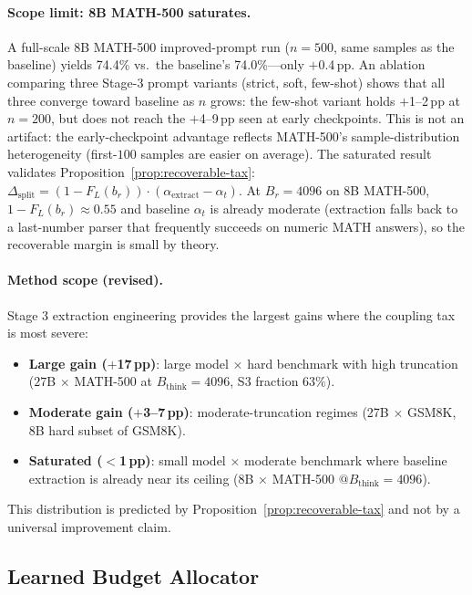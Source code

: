 \paragraph{Scope limit: 8B MATH-500 saturates.}
A full-scale 8B MATH-500 improved-prompt run ($n{=}500$, same samples as the baseline) yields 74.4\% vs.\ the baseline's 74.0\%---only $+$0.4\,pp.
An ablation comparing three Stage-3 prompt variants (strict, soft, few-shot) shows that all three converge toward baseline as $n$ grows: the few-shot variant holds $+$1--2\,pp at $n{=}200$, but does not reach the $+$4--9\,pp seen at early checkpoints.
This is not an artifact: the early-checkpoint advantage reflects MATH-500's sample-distribution heterogeneity (first-$100$ samples are easier on average).
The saturated result validates Proposition~\ref{prop:recoverable-tax}: $\Delta_{\mathrm{split}} = (1 - F_L(b_r)) \cdot (\alpha_{\mathrm{extract}} - \alpha_t)$.
At $B_r{=}4096$ on 8B MATH-500, $1 - F_L(b_r) \approx 0.55$ and baseline $\alpha_t$ is already moderate (extraction falls back to a last-number parser that frequently succeeds on numeric MATH answers), so the recoverable margin is small by theory.

\paragraph{Method scope (revised).}
Stage 3 extraction engineering provides the largest gains where the coupling tax is most severe:
\begin{itemize}[nosep,leftmargin=*]
  \item \textbf{Large gain ($+$17\,pp)}: large model $\times$ hard benchmark with high truncation ($27$B $\times$ MATH-500 at $B_{\text{think}}{=}4096$, S3 fraction $63\%$).
  \item \textbf{Moderate gain ($+$3--7\,pp)}: moderate-truncation regimes (27B $\times$ GSM8K, 8B hard subset of GSM8K).
  \item \textbf{Saturated ($<$1\,pp)}: small model $\times$ moderate benchmark where baseline extraction is already near its ceiling (8B $\times$ MATH-500 $@B_{\text{think}}{=}4096$).
\end{itemize}
This distribution is predicted by Proposition~\ref{prop:recoverable-tax} and not by a universal improvement claim.

\subsection{Learned Budget Allocator}
\label{sec:experiments:learned-allocator}

